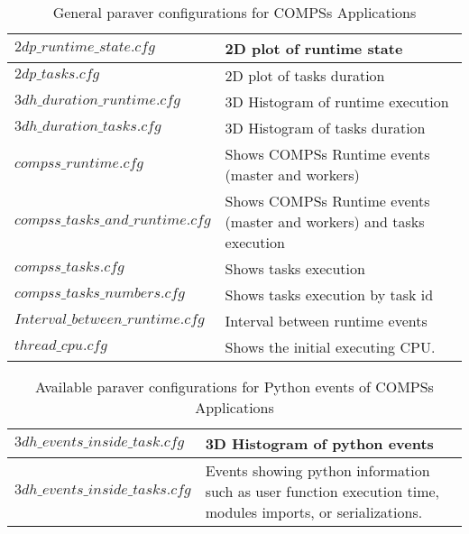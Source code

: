 \bgroup
  \def\arraystretch{1.5}
  \begin{table}[!ht]
    \begin{center}
      \begin{tabular}{| p{} | p{} |}
	\hline
	$2dp\_runtime\_state.cfg$		& 2D plot of runtime state \\ \hline
	$2dp\_tasks.cfg$			& 2D plot of tasks duration \\ \hline
	$3dh\_duration\_runtime.cfg$		& 3D Histogram of runtime execution \\ \hline
	$3dh\_duration\_tasks.cfg$		& 3D Histogram of tasks duration \\ \hline
	$compss\_runtime.cfg$ 			& Shows COMPSs Runtime events (master and workers) \\ \hline
	$compss\_tasks\_and\_runtime.cfg$ 	& Shows COMPSs Runtime events (master and workers) and tasks execution \\ \hline
	$compss\_tasks.cfg$ 			& Shows tasks execution \\ \hline
	$compss\_tasks\_numbers.cfg$ 		& Shows tasks execution by task id \\ \hline
	$Interval\_between\_runtime.cfg$ 	& Interval between runtime events \\ \hline
	$thread\_cpu.cfg$			& Shows the initial executing CPU. \\ \hline
      \end{tabular}
      \caption{General paraver configurations for COMPSs Applications}
      \label{tab:paraver_configs_general}
    \end{center}
  \end{table}
\egroup

\bgroup
  \def\arraystretch{1.5}
  \begin{table}[!ht]
    \begin{center}
      \begin{tabular}{| p{} | p{} |}
	\hline
	$3dh\_events\_inside\_task.cfg$		& 3D Histogram of python events \\ \hline
	$3dh\_events\_inside\_tasks.cfg$	& Events showing python information such as user function execution time, modules imports, or serializations. \\ \hline
      \end{tabular}
      \caption{Available paraver configurations for Python events of COMPSs Applications}
      \label{tab:paraver_configs_python}
    \end{center}
  \end{table}
\egroup

